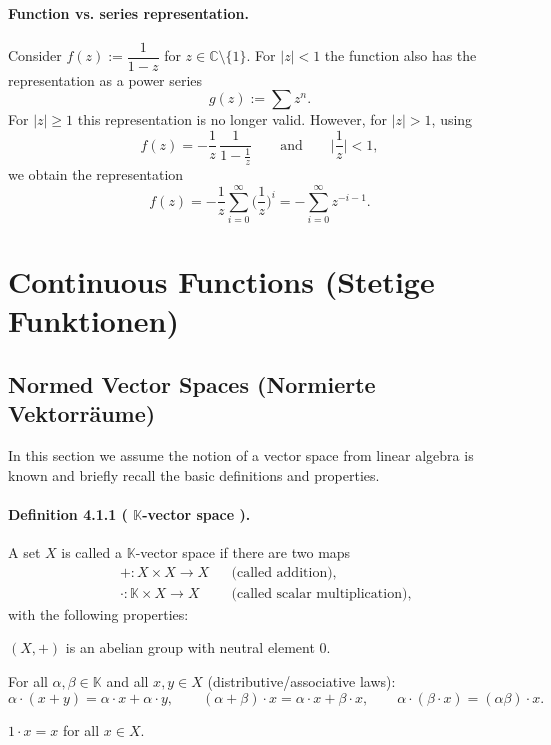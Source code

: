 \documentclass[12pt,a4paper]{article}
\newcommand{\C}{\mathbb{C}}
\newcommand{\K}{\mathbb{K}} %
\newcommand{\NumberedDefinition}[3]{%
\paragraph*{Definition #1 ( #2 ).} #3\par}
\theoremstyle{plain}
\theoremstyle{definition}
\theoremstyle{remark}
\begin{document}
\paragraph{Function vs. series representation.}
Consider $f(z) := \dfrac{1}{1-z}$ for $z\in\C\setminus\{1\}$. For $|z|<1$ the function also has the representation as a power series
\[
	g(z) := \sum z^{n}.
\]
For $|z|\ge1$ this representation is no longer valid. However, for $|z|>1$, using
\[
	f(z) = -\frac{1}{z}\,\frac{1}{1-\tfrac{1}{z}} \qquad\text{and}\qquad \Big|\frac{1}{z}\Big|<1,
\]
we obtain the representation
\[
	f(z) = -\frac{1}{z}\sum_{i=0}^{\infty} \Big(\frac{1}{z}\Big)^{i} = -\sum_{i=0}^{\infty} z^{-i-1}.
\]
	
\section{Continuous Functions (Stetige Funktionen)}

\subsection{Normed Vector Spaces (Normierte Vektorräume)}

In this section we assume the notion of a vector space from linear algebra is known and briefly recall the basic definitions and properties.

\NumberedDefinition{4.1.1}{$\K$-vector space}{A set $X$ is called a $\K$-vector space if there are two maps
\[
\begin{aligned}
 &+ : X\times X \to X &&\text{(called addition)},\\
 &\cdot : \K\times X \to X &&\text{(called scalar multiplication)},
\end{aligned}
\]
with the following properties:
\begin{description}[leftmargin=*]
	\item[VR1] $(X,+)$ is an abelian group with neutral element $0$.
	\item[VR2] For all $\alpha,\beta\in\K$ and all $x,y\in X$ (distributive/associative laws):
	\[
		\alpha\cdot(x+y)=\alpha\cdot x+\alpha\cdot y,\qquad
		(\alpha+\beta)\cdot x = \alpha\cdot x + \beta\cdot x,\qquad
		\alpha\cdot(\beta\cdot x)=(\alpha\beta)\cdot x.
	\]
	\item[VR3] $1\cdot x = x$ for all $x\in X$.
\end{description}}
\end{document}
